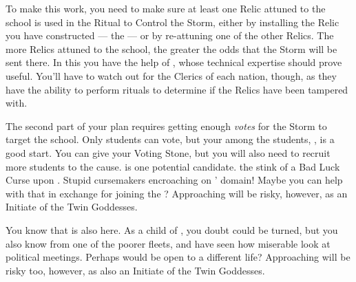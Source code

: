\documentclass[char]{GL2020}
\begin{document}
To make this work, you need to make sure at least one Relic attuned to the school is used in the Ritual to Control the Storm, either by installing the Relic you have constructed — the \iHorseshoe{} — or by re-attuning one of the other Relics. The more Relics attuned to the school, the greater the odds that the Storm will be sent there. In this you have the help of \cChupInventor{}, whose technical expertise should prove useful. You'll have to watch out for the Clerics of each nation, though, as they have the ability to perform rituals to determine if the Relics have been tampered with. 

The second part of your plan requires getting enough \emph{votes} for the Storm to target the school. Only students can vote, but your \pGoatie{} among the students, \cChupStudent{}, is a good start. You can give \cChupStudent{\them} your Voting Stone, but you will also need to recruit more students to the cause. \cInitiate{\intro} is one potential candidate. \cInitiate{\Theyhave} the stink of a Bad Luck Curse upon \cInitiate{\them}. Stupid \pFarm{} cursemakers encroaching on \cGenesis{}' domain! Maybe you can help \cInitiate{\them} with that in exchange for joining the \pGoaties{}? Approaching \cInitiate{\them} will be risky, however, as \cInitiate{\theyare} an Initiate of the Twin Goddesses. 

You know that \cWarlordDaughter{\intro} is also here. As a child of \cLoud{\intro}, you doubt \cWarlordDaughter{\they} could be turned, but you also know \cWarlordDaughter{\theyare} from one of the poorer fleets, and have seen how miserable \cWarlordDaughter{\they} look\cWarlordDaughter{\verbs} at political meetings. Perhaps \cWarlordDaughter{\they} would be open to a different life? Approaching \cWarlordDaughter{} will be risky too, however, as \cWarlordDaughter{\theyare} also an Initiate of the Twin Goddesses. 
\end{document}
